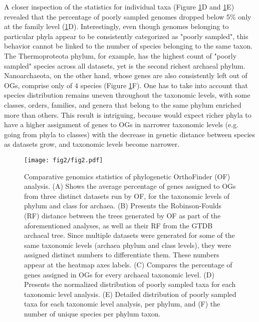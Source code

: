 A closer inspection of the statistics for individual taxa (Figure \ref{orthofinder_stats_figure}D and \ref{orthofinder_stats_figure}E) revealed that the percentage of poorly sampled genomes dropped below 5\% only at the family level (\ref{orthofinder_stats_figure}D). Interestingly, even though genomes belonging to particular phyla appear to be consistently categorized as "poorly sampled", this behavior cannot be linked to the number of species belonging to the same taxon. The Thermoproteota phylum, for example, has the highest count of "poorly sampled" species across all datasets, yet is the second richest archaeal phylum. Nanoarchaeota, on the other hand, whose genes are also consistently left out of OGs, comprise only of 4 species (Figure \ref{orthofinder_stats_figure}F). One has to take into account that species distribution remains uneven throughout the taxonomic levels, with some classes, orders, families, and genera that belong to the same phylum enriched more than others. This result is intriguing, because would expect richer phyla to have a higher assignment of genes to OGs in narrower taxonomic levels (e.g. going from phyla to classes) with the decrease in genetic distance between species as datasets grow, and taxonomic levels become narrower.  

\begin{figure}[htpb]
    \centering
    \texttt{[image: fig2/fig2.pdf]}
    \caption{Comparative genomics statistics of phylogenetic OrthoFinder (OF) analysis. (A) Shows the average percentage of genes assigned to OGs from three distinct datasets run by OF, for the taxonomic levels of phylum and class for archaea. (B) Presents the Robinson-Foulds (RF) distance between the trees generated by OF as part of the aforementioned analyses, as well as their RF from the GTDB archaeal tree. Since multiple datasets were generated for some of the same taxonomic levels (archaea phylum and class levels), they were assigned distinct numbers to differentiate them. These numbers appear at the heatmap axes labels. (C) Compares the percentage of genes assigned in OGs for every archaeal taxonomic level. (D) Presents the normalized distribution of poorly sampled taxa for each taxonomic level analysis. (E) Detailed distribution of poorly sampled taxa for each taxonomic level analysis, per phylum, and (F) the number of unique species per phylum taxon.}
    \label{orthofinder_stats_figure}
\end{figure}   

